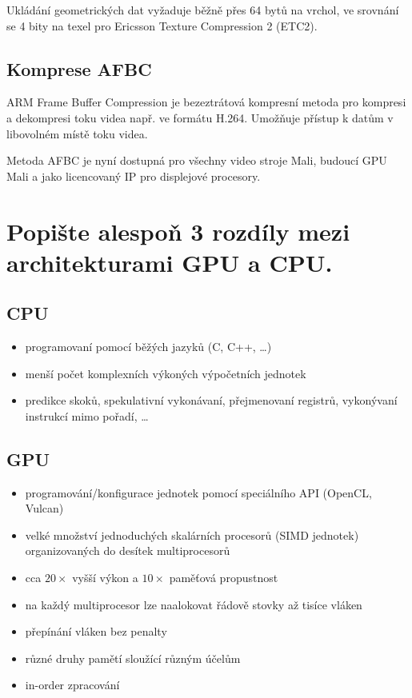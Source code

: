 		Ukládání geometrických dat vyžaduje běžně přes 64 bytů na vrchol, ve srovnání se 4 bity na texel pro Ericsson Texture Compression 2 (ETC2).

	\subsection*{Komprese AFBC}
		ARM Frame Buffer Compression je bezeztrátová kompresní metoda pro kompresi a dekompresi toku videa např. ve formátu H.264. Umožňuje přístup k datům v libovolném místě toku videa.
	
	Metoda AFBC je nyní dostupná pro všechny video stroje Mali, budoucí GPU Mali a jako licencovaný IP pro displejové procesory. 

	
	
\section{Popište alespoň 3 rozdíly mezi architekturami GPU a CPU.}
	\subsection*{CPU}
		\begin{itemize}
			\setlength\itemsep{0em}
			\item programovaní pomocí běžých jazyků (C, C++, \dots)
			\item menší počet komplexních výkoných výpočetních jednotek
			\item predikce skoků, spekulativní vykonávaní, přejmenovaní registrů, vykonývaní instrukcí mimo pořadí, \dots
		\end{itemize}
	\subsection*{GPU}
		\begin{itemize}
			\setlength\itemsep{0em}
			\item programování/konfigurace jednotek pomocí speciálního API (OpenCL, Vulcan)
			\item velké množství jednoduchých skalárních procesorů (SIMD jednotek) organizovaných do desítek multiprocesorů
			\item cca $20\times$ vyšší výkon a $10\times$ paměťová propustnost			
			\item na každý multiprocesor lze naalokovat řádově stovky až tisíce vláken
			\item přepínání vláken bez penalty
			\item různé druhy pamětí sloužící různým účelům
			\item in-order zpracování
		\end{itemize}
	

